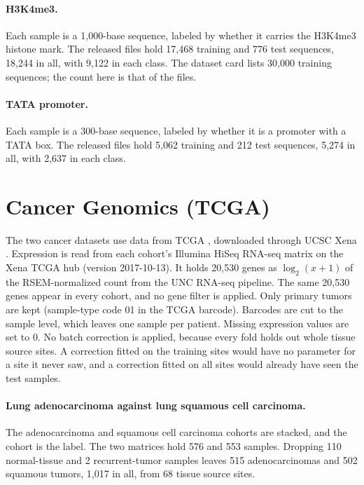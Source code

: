 \paragraph{H3K4me3.} Each sample is a 1,000-base sequence, labeled by whether it carries the H3K4me3 histone mark. The released files hold 17,468 training and 776 test sequences, 18,244 in all, with 9,122 in each class. The dataset card lists 30,000 training sequences; the count here is that of the files.

\paragraph{TATA promoter.} Each sample is a 300-base sequence, labeled by whether it is a promoter with a TATA box. The released files hold 5,062 training and 212 test sequences, 5,274 in all, with 2,637 in each class.

\section{Cancer Genomics (TCGA)}\label{app:datasets:tcga}

The two cancer datasets use data from TCGA \citep{Weinstein2013}, downloaded through UCSC Xena \citep{Goldman2020}. Expression is read from each cohort's Illumina HiSeq RNA-seq matrix on the Xena TCGA hub (version 2017-10-13). It holds 20,530 genes as $\log_2(x+1)$ of the RSEM-normalized count \citep{Li2011RSEM} from the UNC RNA-seq pipeline. The same 20,530 genes appear in every cohort, and no gene filter is applied. Only primary tumors are kept (sample-type code 01 in the TCGA barcode). Barcodes are cut to the sample level, which leaves one sample per patient. Missing expression values are set to 0. No batch correction is applied, because every fold holds out whole tissue source sites. A correction fitted on the training sites would have no parameter for a site it never saw, and a correction fitted on all sites would already have seen the test samples.

\paragraph{Lung adenocarcinoma against lung squamous cell carcinoma.} The adenocarcinoma \citep{TCGA2014LUAD} and squamous cell carcinoma \citep{TCGA2012LUSC} cohorts are stacked, and the cohort is the label. The two matrices hold 576 and 553 samples. Dropping 110 normal-tissue and 2 recurrent-tumor samples leaves 515 adenocarcinomas and 502 squamous tumors, 1,017 in all, from 68 tissue source sites.

